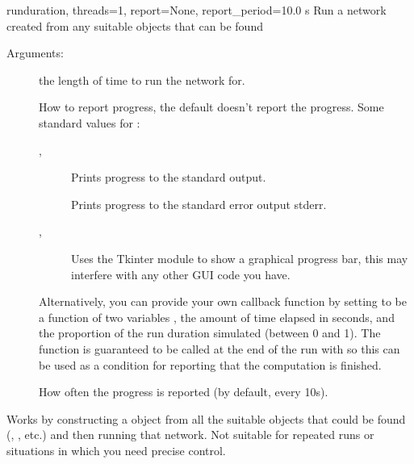 \documentclass[letterpaper,10pt,english]{manual}
\begin{document}
\hypertarget{brian.run}{}\begin{funcdesc}{run}{duration, threads=1, report=None, report\_period=10.0 s}
Run a network created from any suitable objects that can be found

Arguments:
\begin{description}
\item[] \leavevmode
the length of time to run the network for.

\item[] \leavevmode
How to report progress, the default  doesn't report the
progress. Some standard values for :
\begin{description}
\item[, ] \leavevmode
Prints progress to the standard output.

\item[] \leavevmode
Prints progress to the standard error output stderr.

\item[, ] \leavevmode
Uses the Tkinter module to show a graphical progress bar,
this may interfere with any other GUI code you have.

\end{description}

Alternatively, you can provide your own callback function by
setting  to be a function 
of two variables , the amount of time elapsed in
seconds, and  the proportion of the run duration
simulated (between 0 and 1). The  function is
guaranteed to be called at the end of the run with
 so this can be used as a condition for
reporting that the computation is finished.

\item[] \leavevmode
How often the progress is reported (by default, every 10s).

\end{description}

Works by constructing a \hyperlink{brian.MagicNetwork}{} object from all the suitable
objects that could be found (\hyperlink{brian.NeuronGroup}{}, \hyperlink{brian.Connection}{}, etc.) and
then running that network. Not suitable for repeated runs or situations
in which you need precise control.
\end{funcdesc}
\end{document}
